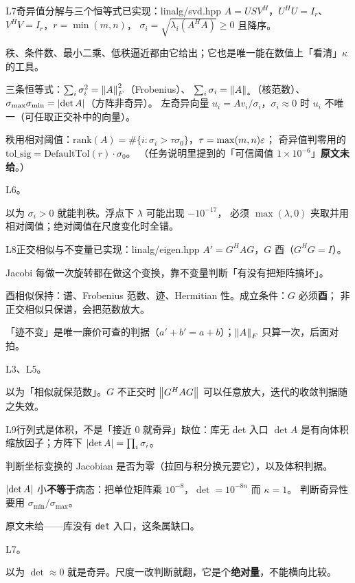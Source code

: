 \begin{know}{L7}{奇异值分解与三个恒等式}{已实现：linalg/svd.hpp}
 $A=USV^{H}$，$U^{H}U=I_r$、$V^{H}V=I_r$，$r=\min(m,n)$，
$\sigma_i=\sqrt{\lambda_i(A^{H}A)}\ge0$ 且降序。

 秩、条件数、最小二乘、低秩逼近都由它给出；它也是唯一能在数值上「看清」$\kappa$ 的工具。

 三条恒等式：$\sum_i\sigma_i^{2}=\left\lVert A\right\rVert_{F}^{2}$（Frobenius）、
$\sum_i\sigma_i=\left\lVert A\right\rVert_{*}$（核范数）、$\sigma_{\max}\sigma_{\min}=\left\lvert \det A\right\rvert$（方阵非奇异）。
左奇异向量 $u_i=Av_i/\sigma_i$，$\sigma_i\approx0$ 时 $u_i$ 不唯一（可任取正交补中的向量）。

 秩用相对阈值：$\mathrm{rank}(A)=\#\{i:\sigma_i>\tau\sigma_0\}$，$\tau=\max(m,n)\varepsilon$；
奇异值判零用的 $\mathrm{tol\_sig}=\mathrm{DefaultTol}(r)\cdot\sigma_0$。
（任务说明里提到的「可信阈值 $1\times10^{-6}$」\textbf{原文未给}。）

 L6。

 以为 $\sigma_i>0$ 就能判秩。浮点下 $\lambda$ 可能出现 $-10^{-17}$，
必须 $\max(\lambda,0)$ 夹取并用相对阈值；绝对阈值在尺度变化时全错。
\end{know}

\begin{know}{L8}{正交相似与不变量}{已实现：linalg/eigen.hpp}
 $A'=G^{H}AG$，$G$ 酉（$G^{H}G=I$）。

 Jacobi 每做一次旋转都在做这个变换，靠不变量判断「有没有把矩阵搞坏」。

 酉相似保持：谱、Frobenius 范数、迹、Hermitian 性。成立条件：$G$ 必须\textbf{酉}；
非正交相似只保谱，会把范数放大。

 「迹不变」是唯一廉价可查的判据（$a'+b'=a+b$）；$\left\lVert A\right\rVert_{F}$ 只算一次，后面对拍。

 L3、L5。

 以为「相似就保范数」。$G$ 不正交时 $\left\lVert G^{H}AG\right\rVert$ 可以任意放大，迭代的收敛判据随之失效。
\end{know}

\begin{know}{L9}{行列式是体积，不是「接近 0 就奇异」}{缺位：库无 det 入口}
 $\det A$ 是有向体积缩放因子；方阵下 $\left\lvert \det A\right\rvert=\prod_i\sigma_i$。

 判断坐标变换的 Jacobian 是否为零（拉回与积分换元要它），以及体积判据。

 $\left\lvert \det A\right\rvert$ 小\textbf{不等于}病态：把单位矩阵乘 $10^{-8}$，$\det=10^{-8n}$ 而 $\kappa=1$。
判断奇异性要用 $\sigma_{\min}/\sigma_{\max}$。

 原文未给——库没有 \texttt{det} 入口，这条属缺口。

 L7。

 以为 $\det\approx0$ 就是奇异。尺度一改判断就翻，它是个\textbf{绝对量}，不能横向比较。
\end{know}

